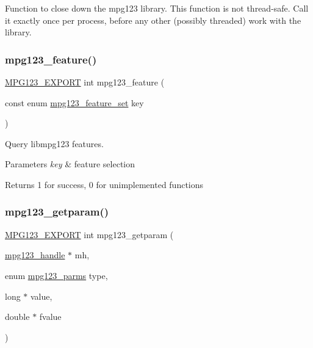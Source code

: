 Function to close down the mpg123 library. This function is not thread-\/safe. Call it exactly once per process, before any other (possibly threaded) work with the library. \mbox{\label{group__mpg123__init_gaf9b00e4fc7273c0d5e41d6d490606d56}} 
\subsubsection{\texorpdfstring{mpg123\_feature()}{mpg123\_feature()}}
{\footnotesize\ttfamily \mbox{\hyperlink{mpg123_8h_a2ba98cfba3f760879df70e755b2a61cc}{M\+P\+G123\+\_\+\+E\+X\+P\+O\+RT}} int mpg123\+\_\+feature (\begin{DoxyParamCaption}\item[{const enum \mbox{\hyperlink{group__mpg123__init_gab26f1b8c3289847f5928176a20b4c942}{mpg123\+\_\+feature\+\_\+set}}}]{key }\end{DoxyParamCaption})}

Query libmpg123 features. 
\begin{DoxyParams}{Parameters}
{\em key} & feature selection \\
\hline
\end{DoxyParams}
\begin{DoxyReturn}{Returns}
1 for success, 0 for unimplemented functions 
\end{DoxyReturn}
\mbox{\label{group__mpg123__init_ga2b742bb1eecc9d29a09aa9a7f69b52af}} 
\subsubsection{\texorpdfstring{mpg123\_getparam()}{mpg123\_getparam()}}
{\footnotesize\ttfamily \mbox{\hyperlink{mpg123_8h_a2ba98cfba3f760879df70e755b2a61cc}{M\+P\+G123\+\_\+\+E\+X\+P\+O\+RT}} int mpg123\+\_\+getparam (\begin{DoxyParamCaption}\item[{\mbox{\hyperlink{group__mpg123__init_ga6728e2839a395f3a07d4514da659faca}{mpg123\+\_\+handle}} $\ast$}]{mh,  }\item[{enum \mbox{\hyperlink{group__mpg123__init_ga73a8ff3363028b89afc72b3ea032b9cb}{mpg123\+\_\+parms}}}]{type,  }\item[{long $\ast$}]{value,  }\item[{double $\ast$}]{fvalue }\end{DoxyParamCaption})}

